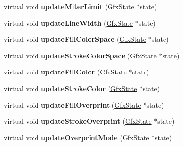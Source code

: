 \begin{DoxyCompactItemize}
\item 
\mbox{\label{class_p_s_output_dev_a57c2ee4ada45b975f5891aaa620fe1cd}} 
virtual void {\bfseries update\+Miter\+Limit} (\hyperlink{class_gfx_state}{Gfx\+State} $\ast$state)
\item 
\mbox{\label{class_p_s_output_dev_a653d55e0e05c7dba8f0de48afc5265c6}} 
virtual void {\bfseries update\+Line\+Width} (\hyperlink{class_gfx_state}{Gfx\+State} $\ast$state)
\item 
\mbox{\label{class_p_s_output_dev_af6c69c580344e1c14c84656851a82576}} 
virtual void {\bfseries update\+Fill\+Color\+Space} (\hyperlink{class_gfx_state}{Gfx\+State} $\ast$state)
\item 
\mbox{\label{class_p_s_output_dev_a1005446b0f02c1f2f645a1889263617b}} 
virtual void {\bfseries update\+Stroke\+Color\+Space} (\hyperlink{class_gfx_state}{Gfx\+State} $\ast$state)
\item 
\mbox{\label{class_p_s_output_dev_ad8b22acd566702e5796c8ea93166cdd2}} 
virtual void {\bfseries update\+Fill\+Color} (\hyperlink{class_gfx_state}{Gfx\+State} $\ast$state)
\item 
\mbox{\label{class_p_s_output_dev_a8038ec502ad6fcba9e467e12ccdca736}} 
virtual void {\bfseries update\+Stroke\+Color} (\hyperlink{class_gfx_state}{Gfx\+State} $\ast$state)
\item 
\mbox{\label{class_p_s_output_dev_a92b5ffbd7989e3ada25156fa7896dd9f}} 
virtual void {\bfseries update\+Fill\+Overprint} (\hyperlink{class_gfx_state}{Gfx\+State} $\ast$state)
\item 
\mbox{\label{class_p_s_output_dev_ad03cd95038430e3d7550f2f5bd7d9342}} 
virtual void {\bfseries update\+Stroke\+Overprint} (\hyperlink{class_gfx_state}{Gfx\+State} $\ast$state)
\item 
\mbox{\label{class_p_s_output_dev_a0804fd5c48a09f24beca44ba61a29536}} 
virtual void {\bfseries update\+Overprint\+Mode} (\hyperlink{class_gfx_state}{Gfx\+State} $\ast$state)
\item 

\end{DoxyCompactItemize}

